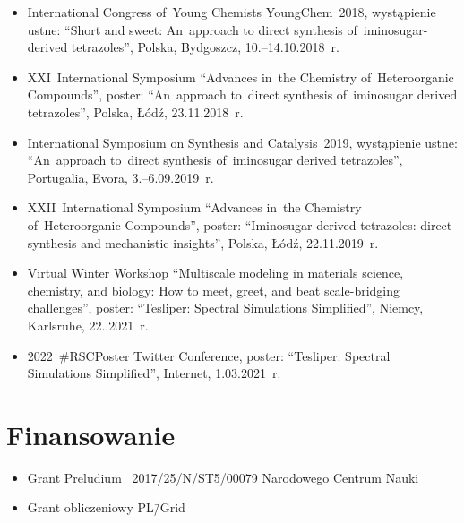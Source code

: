 \begin{fullwidth}
\begin{itemize}
  \item International Congress of~Young Chemists YoungChem~2018, wystąpienie ustne: \enquote{Short and sweet: An~approach to direct synthesis of~iminosugar-derived tetrazoles}, Polska, Bydgoszcz, 10.\-–14.10.2018~r.
  \item XXI~International Symposium \enquote{Advances in~the Chemistry of~Heteroorganic Compounds}, poster: \enquote{An~approach to~direct synthesis of~iminosugar derived tetrazoles}, Polska, Łódź, 23.11.2018~r.
  \item International Symposium on Synthesis and Catalysis~2019, wystąpienie ustne: \enquote{An~approach to~direct synthesis of~iminosugar derived tetrazoles}, Portugalia, Evora, 3.\-–6.09.2019~r.
  \item XXII~International Symposium \enquote{Advances in~the Chemistry of~Heteroorganic Compounds}, poster: \enquote{Iminosugar derived tetrazoles: direct synthesis and mechanistic insights}, Polska, Łódź, 22.11.2019~r.
  \item Virtual Winter Workshop \enquote{Multiscale modeling in materials science, chemistry, and biology: How to meet, greet, and beat scale-bridging challenges}, poster: \enquote{Tesliper: Spectral Simulations Simplified}, Niemcy, Karlsruhe, 22..2021~r.
  \item 2022~\#RSCPoster Twitter Conference, poster: \enquote{Tesliper: Spectral Simulations Simplified}, Internet, 1.03.2021~r.
\end{itemize}
\end{fullwidth}

\section{Finansowanie}\label{intro:founding}
\begin{fullwidth}
\begin{itemize}
  \item Grant Preludium \textnumero~2017/25/N/ST5/00079 Narodowego Centrum Nauki
  \item Grant obliczeniowy PL\=/Grid
\end{itemize}
\end{fullwidth}

\begin{fullwidth}
  \printglossary[title=Wykaz skrótów, type=\acronymtype]
\end{fullwidth}
  